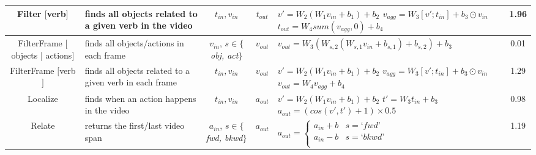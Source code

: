 \documentclass[letterpaper]{article} %
\begin{document}
\begin{table}[t]
{\begin{tabular}{cm{4cm}cclc}
        \makecell[c]{Filter \\ $[$verb$]$} & finds all objects related to a given verb in the video & $t_{in}, v_{in}$ & $t_{out}$ &
            \makecell[l]{
                $v'=W_2(W_1v_{in}+b_1)+b_2$ \\
                $v_{agg}=W_3[v';t_{in}]+b_3 \odot v_{in}$ \\
                $t_{out}=W_4sum(v_{agg},0)+b_4$
            } & 1.96 \\
        \hline

        \makecell[c]{FilterFrame \\ $[$objects | actions$]$} & finds all objects/actions in each frame & \makecell[c]{$v_{in}$, \\ $s \in \{$\textit{obj, act}$\}$} & $v_{out}$ & $v_{out}=W_3(W_{s,2}(W_{s,1}v_{in}+b_{s,1})+b_{s,2})+b_3$ & 0.01 \\
        \hline

        \makecell[c]{FilterFrame \\ $[$verb$]$} & finds all objects related to a given verb in each frame & $t_{in}, v_{in}$ & $v_{out}$ &
            \makecell[l]{
                $v'=W_2(W_1v_{in}+b_1)+b_2$ \\
                $v_{agg}=W_3[v';t_{in}]+b_3 \odot v_{in}$ \\
                $v_{out}=W_4v_{agg}+b_4$
            } & 1.29 \\
        \hline

        Localize & finds when an action happens in the video & $t_{in}, v_{in}$ & $a_{out}$ &
            \makecell[l]{
                $v'=W_2(W_1v_{in}+b_1)+b_2$ \\
                $t'=W_3t_{in}+b_3$ \\
                $a_{out} = (cos(v',t') + 1) \times 0.5 $
            } & 0.98 \\
        \hline

        Relate & returns the first/last video span & \makecell[c]{$a_{in}$, \\ $s \in \{$\textit{fwd, bkwd}$\}$} & $a_{out}$ &
            $ a_{out}=\begin{cases}
                a_{in} + b & s=\textit{`fwd'} \\
                a_{in} - b & s=\textit{`bkwd'} \\
            \end{cases} $ & 1.19 \\
        \hline


\end{tabular}}
\end{table}
\end{document}
